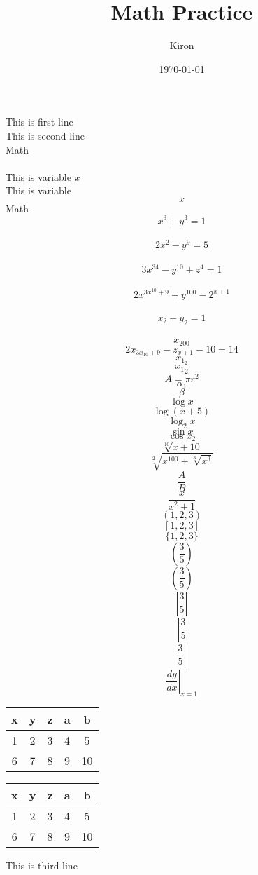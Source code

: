 \documentclass{article}
\title{Math Practice}
\author{Kiron}
\date{\today}
\begin{document}
\maketitle
This is first line
\\
This is second line
\\
Math
\\\\
This is variable $x$
\\
This is variable $$x$$
Math
\\
$$x^3+y^3=1$$
\\
$$2x^2-y^9=5$$
\\
$$3x^{34}-y^{10}+z^4=1$$
\\
$$2x^{3x^{10}+9}+y^{100}-2^{x+1}$$
\\
$$x_2+y_2=1$$
\\
$$x_{200}$$
$$ 2x_{3x_{10}+9}-z_{x+1}-10=14 $$
$$ x_{1_2}$$
$$ {x_1}_2 $$
$$ A=\pi r^2 $$
$$ \alpha_1 $$
$$ \beta $$
$$ \log x $$
$$ \log(x+5) $$
$$ \log_2{x} $$
$$ \sin{x} $$
$$ \cos{x_2} $$
$$ \sqrt[10]{x+10} $$
$$ \sqrt[2]{x^{100}+\sqrt[3]{x^3}} $$
$$ \frac{A}{B} $$
$$ \frac{x}{x^2+1} $$
$$ (1, 2, 3) $$
$$ [1, 2, 3] $$
$$ \{1, 2, 3\} $$
$$ (\frac{3}{5}) $$
$$ \left(\frac{3}{5}\right) $$
$$ \left|\frac{3}{5}\right| $$
$$ \left|\frac{3}{5}\right. $$
$$ \left.\frac{3}{5}\right| $$
$$ \left.\frac{dy}{dx}\right|_{x=1} $$

\begin{tabular}{ccccc}
x&y&z&a&b\\ \hline
1&2&3&4&5\\
6&7&8&9&10
\end{tabular}

\begin{tabular}{|c|c|c|c|c|}
\hline

x&y&z&a&b\\ \hline
1&2&3&4&5\\
6&7&8&9&10\\ \hline

\end{tabular}

This is third line
\end{document}
